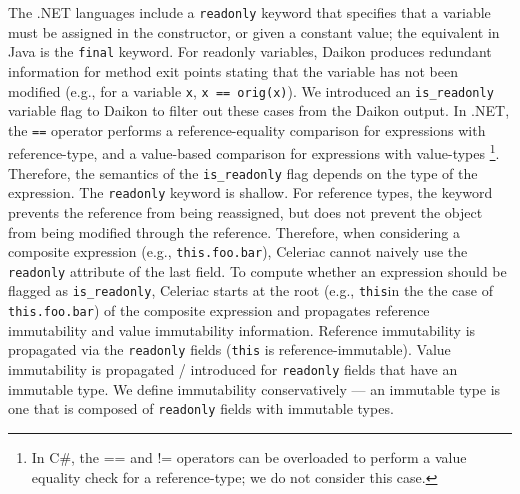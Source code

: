 \documentclass{article}
\newcommand{\todo}[1]{{\color{red}\bfseries [[#1]]}}
\begin{document}
The .NET languages include a \verb|readonly| keyword that specifies
that a variable must be assigned in the constructor, or given a
constant value; the equivalent in Java is the \verb|final|
keyword.
%
For readonly variables, Daikon produces redundant information for
method exit points stating that the variable has not been modified
(e.g., for a variable \verb|x|, \verb|x == orig(x)|).
%
We introduced an \verb|is_readonly| variable flag to Daikon to filter
out these cases from the Daikon output.
%
In .NET, the \verb|==| operator performs a reference-equality
comparison for expressions with reference-type, and a value-based
comparison for expressions with value-types
%
\footnote{In C\#, the == and != operators can be
  overloaded to perform a value equality check for a reference-type;
  we do not consider this case.}.
%
Therefore, the semantics of the \verb|is_readonly| flag depends on the
type of the expression.
%
The \verb|readonly| keyword is shallow. For reference types, the
keyword prevents the reference from being reassigned, but does not
prevent the object from being modified through the reference.
%
Therefore, when considering a composite expression (e.g.,
\verb|this.foo.bar|), Celeriac cannot naively use the \verb|readonly|
attribute of the last field.
%
To compute whether an expression should be flagged as
\verb|is_readonly|, Celeriac starts at the root (e.g., \verb|this|in
the the case of \verb|this.foo.bar|) of the composite expression and
propagates reference immutability and value immutability
information. Reference immutability is propagated via the
\verb|readonly| fields (\verb|this| is reference-immutable). Value
immutability is propagated / introduced for \verb|readonly| fields
that have an immutable type. We define immutability conservatively ---
an immutable type is one that is composed of \verb|readonly| fields
with immutable types.


\end{document}

